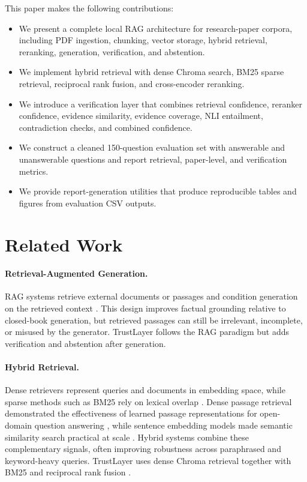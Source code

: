 \documentclass[11pt]{article}
\begin{document}
This paper makes the following contributions:

\begin{itemize}
    \item We present a complete local RAG architecture for research-paper corpora, including PDF ingestion, chunking, vector storage, hybrid retrieval, reranking, generation, verification, and abstention.
    \item We implement hybrid retrieval with dense Chroma search, BM25 sparse retrieval, reciprocal rank fusion, and cross-encoder reranking.
    \item We introduce a verification layer that combines retrieval confidence, reranker confidence, evidence similarity, evidence coverage, NLI entailment, contradiction checks, and combined confidence.
    \item We construct a cleaned 150-question evaluation set with answerable and unanswerable questions and report retrieval, paper-level, and verification metrics.
    \item We provide report-generation utilities that produce reproducible tables and figures from evaluation CSV outputs.
\end{itemize}

\section{Related Work}

\paragraph{Retrieval-Augmented Generation.}
RAG systems retrieve external documents or passages and condition generation on the retrieved context \citep{lewis2020rag}. This design improves factual grounding relative to closed-book generation, but retrieved passages can still be irrelevant, incomplete, or misused by the generator. TrustLayer follows the RAG paradigm but adds verification and abstention after generation.

\paragraph{Hybrid Retrieval.}
Dense retrievers represent queries and documents in embedding space, while sparse methods such as BM25 rely on lexical overlap \citep{robertson2009bm25}. Dense passage retrieval demonstrated the effectiveness of learned passage representations for open-domain question answering \citep{karpukhin2020dpr}, while sentence embedding models made semantic similarity search practical at scale \citep{reimers2019sbert}. Hybrid systems combine these complementary signals, often improving robustness across paraphrased and keyword-heavy queries. TrustLayer uses dense Chroma retrieval together with BM25 and reciprocal rank fusion \citep{cormack2009rrf}.
\end{document}
